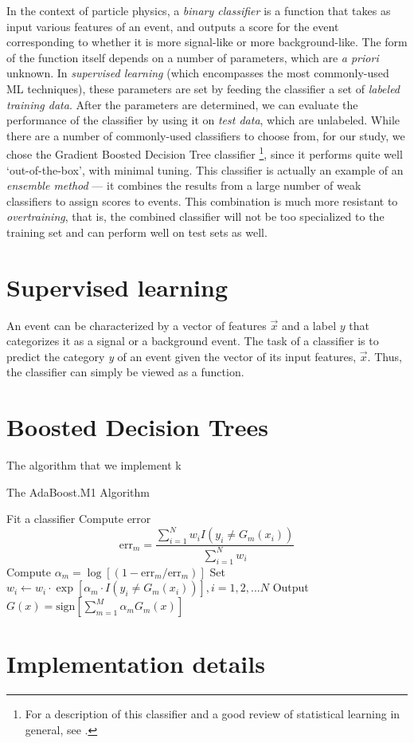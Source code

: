 In the context of particle physics, a \emph{binary classifier} is a function that takes as input various features of an event, and outputs a score for the event corresponding to whether it is more signal-like or more background-like. The form of the function itself depends on a number of parameters, which are \emph{a priori} unknown. In \emph{supervised learning} (which encompasses the most commonly-used ML techniques), these parameters are set by feeding the classifier a set of \emph{labeled training data}. After the parameters are determined, we can evaluate the performance of the classifier by using it on \emph{test data}, which are unlabeled. While there are a number of commonly-used classifiers to choose from, for our study, we chose the Gradient Boosted Decision Tree classifier \footnote{For a description of this classifier and a good review of statistical learning in general, see \citep{Hastie2011}.}, since it performs quite well `out-of-the-box', with minimal tuning. This classifier is actually an example of an \emph{ensemble method} --- it combines the results from a large number of weak classifiers to assign scores to events. This combination is much more resistant to \emph{overtraining}, that is, the combined classifier will not be too specialized to the training set and can perform well on test sets as well.


\section{Supervised learning}
An event can be characterized by a vector of features $\vec{x}$ and a label $y$ that categorizes it as a signal or a background event. The task of a classifier is to predict the category \emph{y} of an event given the vector of its input features, $\vec{x}$. Thus, the classifier can simply be viewed as a function.
\section{Boosted Decision Trees}
The algorithm that we implement k
\begin{algorithm}
\caption{The AdaBoost.M1 Algorithm}\label{adaboost}
\begin{algorithmic}[0]
\State Fit a classifier
\State Compute error 
\[\text{err}_m = \frac{\sum_{i = 1}^N w_i I(y_i\neq G_m(x_i))}{\sum_{i=1}^N w_i}\]
\State Compute $\alpha_m = \log[(1-\text{err}_m/\text{err}_m)]$
\State Set $w_i\gets w_i\cdot \exp[\alpha_m\cdot I(y_i\neq G_m(x_i))], i = 1,2,...N$
\EndFor
\State Output $G(x) = \text{sign}\left[\sum_{m=1}^M\alpha_mG_m(x)\right]$
\end{algorithmic}
\end{algorithm}

\section{Implementation details}
